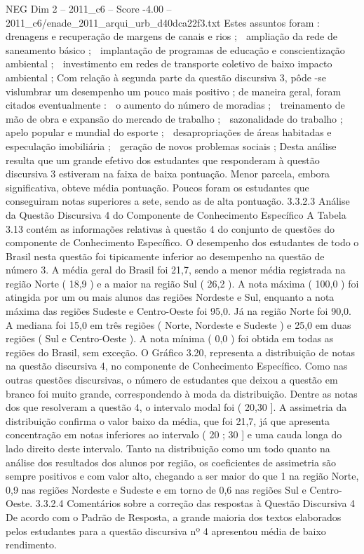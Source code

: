 \begin{textsample}{NEG Dim 2 – 2011\_c6 – Score -4.00 – 2011\_c6/enade\_2011\_arqui\_urb\_d40dca22f3.txt}
Estes assuntos foram :  drenagens e recuperação de margens de canais e rios ;  ampliação da rede de saneamento básico ;  implantação de programas de educação e conscientização ambiental ;  investimento em redes de transporte coletivo de baixo impacto ambiental ; Com relação à segunda parte da questão discursiva 3, pôde -se vislumbrar um desempenho um pouco mais positivo ; de maneira geral, foram citados eventualmente :  o aumento do número de moradias ;  treinamento de mão de obra e expansão do mercado de trabalho ;  sazonalidade do trabalho ;  apelo popular e mundial do esporte ;  desapropriações de áreas habitadas e especulação imobiliária ;  geração de novos problemas sociais ; Desta análise resulta que um grande efetivo dos estudantes que responderam à questão discursiva 3 estiveram na faixa de baixa pontuação.
Menor parcela, embora significativa, obteve média pontuação.
Poucos foram os estudantes que conseguiram notas superiores a sete, sendo as de alta pontuação. 3.3.2.3 Análise da Questão Discursiva 4 do Componente de Conhecimento Específico A Tabela 3.13 contém as informações relativas à questão 4 do conjunto de questões do componente de Conhecimento Específico.
O desempenho dos estudantes de todo o Brasil nesta questão foi tipicamente inferior ao desempenho na questão de número 3.
A média geral do Brasil foi 21,7, sendo a menor média registrada na região Norte ( 18,9 ) e a maior na região Sul ( 26,2 ).
A nota máxima ( 100,0 ) foi atingida por um ou mais alunos das regiões Nordeste e Sul, enquanto a nota máxima das regiões Sudeste e Centro-Oeste foi 95,0.
Já na região Norte foi 90,0.
A mediana foi 15,0 em três regiões ( Norte, Nordeste e Sudeste ) e 25,0 em duas regiões ( Sul e Centro-Oeste ).
A nota mínima ( 0,0 ) foi obtida em todas as regiões do Brasil, sem exceção.
O Gráfico 3.20, representa a distribuição de notas na questão discursiva 4, no componente de Conhecimento Específico.
Como nas outras questões discursivas, o número de estudantes que deixou a questão em branco foi muito grande, correspondendo à moda da distribuição.
Dentre as notas dos que resolveram a questão 4, o intervalo modal foi ( 20,30 ].
A assimetria da distribuição confirma o valor baixo da média, que foi 21,7, já que apresenta concentração em notas inferiores ao intervalo ( 20 ; 30 ] e uma cauda longa do lado direito deste intervalo.
Tanto na distribuição como um todo quanto na análise dos resultados dos alunos por região, os coeficientes de assimetria são sempre positivos e com valor alto, chegando a ser maior do que 1 na região Norte, 0,9 nas regiões Nordeste e Sudeste e em torno de 0,6 nas regiões Sul e Centro-Oeste. 3.3.2.4 Comentários sobre a correção das respostas à Questão Discursiva 4 De acordo com o Padrão de Resposta, a grande maioria dos textos elaborados pelos estudantes para a questão discursiva nº 4 apresentou média de baixo rendimento.

\end{textsample}
